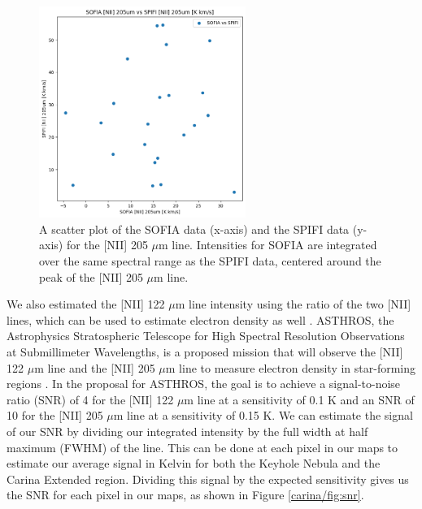 \begin{figure}
    \centering
    \includegraphics[width=0.6\textwidth]{figs/carina/oberst.png}
    \caption[Scatter Plot of SPIFI and SOFIA {[NII]} 205 $\mu$m Line Intensities]{
        A scatter plot of the SOFIA data (x-axis) and the SPIFI data (y-axis) for the [NII] 205 $\mu$m line.
        Intensities for SOFIA are integrated over the same spectral range as the SPIFI data, centered around the peak of the [NII] 205 $\mu$m line.
        }
    \label{carina/fig:oberst}
\end{figure}

We also estimated the [NII] 122 $\mu$m line intensity using the ratio of the two [NII] lines, which can be used to estimate electron density as well \parencite{goldsmith2015herschel}.
ASTHROS, the Astrophysics Stratospheric Telescope for High Spectral Resolution Observations at Submillimeter Wavelengths, is a proposed mission that will observe the [NII] 122 $\mu$m line and the [NII] 205 $\mu$m line to measure electron density in star-forming regions \parencite{siles2020asthros}.
In the proposal for ASTHROS, the goal is to achieve a signal-to-noise ratio (SNR) of 4 for the [NII] 122 $\mu$m line at a sensitivity of 0.1 K and an SNR of 10 for the [NII] 205 $\mu$m line at a sensitivity of 0.15 K.
We can estimate the signal of our SNR by dividing our integrated intensity by the full width at half maximum (FWHM) of the line.
This can be done at each pixel in our maps to estimate our average signal in Kelvin for both the Keyhole Nebula and the Carina Extended region.
Dividing this signal by the expected sensitivity gives us the SNR for each pixel in our maps, as shown in Figure \ref{carina/fig:snr}.

